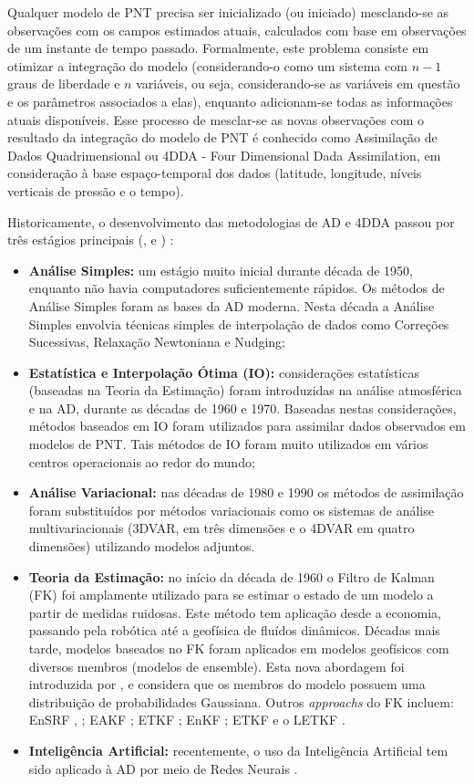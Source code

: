 Qualquer modelo de PNT precisa ser inicializado (ou iniciado) mesclando-se as observações com os campos estimados atuais, calculados com base em observações de um instante de tempo passado. Formalmente, este problema consiste em otimizar a integração do modelo (considerando-o como um sistema com $n-1$ graus de liberdade e $n$ variáveis, ou seja, considerando-se as variáveis em questão e os parâmetros associados a elas), enquanto adicionam-se todas as informações atuais disponíveis. Esse processo de mesclar-se as novas observações com o resultado da integração do modelo de PNT é conhecido como Assimilação de Dados Quadrimensional ou 4DDA - Four Dimensional Dada Assimilation, em consideração à base espaço-temporal dos dados (latitude, longitude, níveis verticais de pressão e o tempo).

Historicamente, o desenvolvimento das metodologias de AD e 4DDA passou por três estágios principais (\cite{wang2000}, e \cite{kalnay2003}) :

\begin{itemize}
\item \textbf{Análise Simples:} um estágio muito inicial durante década de 1950, enquanto não havia computadores suficientemente rápidos. Os métodos de Análise Simples foram as bases da AD moderna. Nesta década a Análise Simples envolvia técnicas simples de interpolação de dados como Correções Sucessivas, Relaxação Newtoniana e Nudging;
\item \textbf{Estatística e Interpolação Ótima (IO):} considerações estatísticas (baseadas na Teoria da Estimação) foram introduzidas na análise atmosférica e na AD, durante as décadas de 1960 e 1970. Baseadas nestas considerações, métodos baseados em IO foram utilizados para assimilar dados observados em modelos de PNT. Tais métodos de IO foram muito utilizados em vários centros operacionais ao redor do mundo;
\item \textbf{Análise Variacional:} nas décadas de 1980 e 1990 os métodos de assimilação foram substituídos por métodos variacionais como os sistemas de análise multivariacionais (3DVAR, em três dimensões e o 4DVAR em quatro dimensões) utilizando modelos adjuntos. 
\item \textbf{Teoria da Estimação:} no início da década de 1960 o Filtro de Kalman (FK) foi amplamente utilizado para se estimar o estado de um modelo a partir de medidas ruidosas. Este método tem aplicação desde a economia, passando pela robótica até a geofísica de fluídos dinâmicos. Décadas mais tarde, modelos baseados no FK foram aplicados em modelos geofísicos com diversos membros (modelos de ensemble). Esta nova abordagem foi introduzida por \cite{evensen94}, \cite{evensen03} e considera que os membros do modelo possuem uma distribuição de probabilidades Gaussiana. Outros \textit{approachs} do FK incluem: EnSRF \cite{andres68}, \cite{withakerhamill02}; EAKF \cite{anderson01}; ETKF \cite{bishopetal01}; EnKF \cite{kalnay04}; ETKF \cite{kalnay03} e o LETKF \cite{hunt05}.
\item \textbf{Inteligência Artificial:} recentemente, o uso da Inteligência Artificial tem sido aplicado à AD por meio de Redes Neurais \cite{nowosad01}.
\end{itemize}

